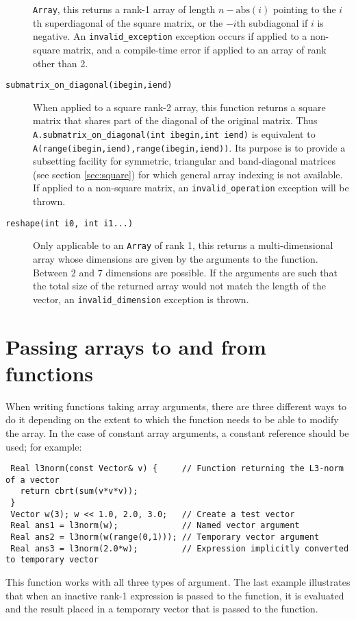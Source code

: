 \documentclass[a4,oneside]{book}
\def\codesize{\small}
\def\code#1{{\codesize\texttt{#1}}}
\def\citem#1{\item[{\codesize\texttt{#1}}]}
\begin{document}
\begin{description}
\code{Array}, this returns a rank-1 array of length
$n-\mathrm{abs}(i)$ pointing to the $i$th superdiagonal of the square
matrix, or the $-i$th subdiagonal if $i$ is negative. An
\code{invalid\_exception} exception occurs if applied to a non-square
matrix, and a compile-time error if applied to an array of rank other
than 2.
%
\citem{submatrix\_on\_diagonal(ibegin,iend)} When applied to a square rank-2
array, this function returns a square matrix that shares part of the
diagonal of the original matrix.  Thus
\code{A.submatrix\_on\_diagonal(int ibegin,int iend)} is equivalent to
\code{A(range(ibegin,iend),range(ibegin,iend))}. Its purpose is to
provide a subsetting facility for symmetric, triangular and
band-diagonal matrices (see section \ref{sec:square}) for which
general array indexing is not available. If applied to a non-square
matrix, an \code{invalid\_operation} exception will be thrown.
\citem{reshape(int i0, int i1...)} Only applicable to an \code{Array}
of rank 1, this returns a multi-dimensional array whose dimensions are
given by the arguments to the function.  Between 2 and 7 dimensions
are possible. If the arguments are such that the total size of the
returned array would not match the length of the vector, an
\code{invalid\_dimension} exception is thrown.
\end{description}

\section{Passing arrays to and from functions}
\label{sec:passing}
When writing functions taking array arguments, there are three
different ways to do it depending on the extent to which the function
needs to be able to modify the array.  In the case of constant array
arguments, a constant reference should be used; for example:
\begin{lstlisting}
 Real l3norm(const Vector& v) {     // Function returning the L3-norm of a vector
   return cbrt(sum(v*v*v));
 }
 Vector w(3); w << 1.0, 2.0, 3.0;   // Create a test vector
 Real ans1 = l3norm(w);             // Named vector argument
 Real ans2 = l3norm(w(range(0,1))); // Temporary vector argument
 Real ans3 = l3norm(2.0*w);         // Expression implicitly converted to temporary vector
\end{lstlisting}
This function works with all three types of argument.  The last
example illustrates that when an inactive rank-1 expression is passed
to the function, it is evaluated and the result placed in a temporary
vector that is passed to the function.
\end{document}
